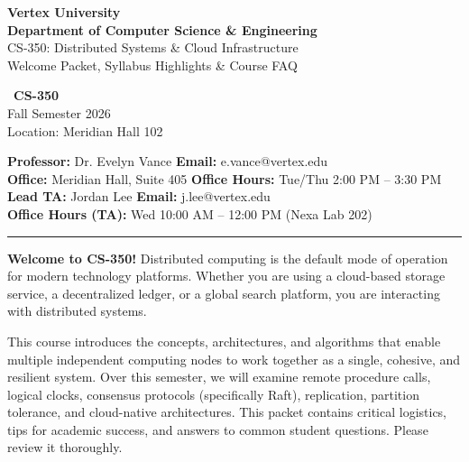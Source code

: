\thispagestyle{plain}

\noindent
\begin{tcolorbox}[
  colback=vertexnavy,
  colframe=vertexnavy,
  arc=4pt,
  boxrule=0pt,
  left=15pt,
  right=15pt,
  top=15pt,
  bottom=15pt
]
  \begin{minipage}[t]{0.7\textwidth}
    \color{white}
    {\huge\bfseries Vertex University}\\[6pt]
    {\large\color{vertexteal!50}\bfseries Department of Computer Science \& Engineering}\\[12pt]
    {\color{white}\Large CS-350: Distributed Systems \& Cloud Infrastructure}\\[4pt]
    {\color{vertexamber}\small Welcome Packet, Syllabus Highlights \& Course FAQ}
  \end{minipage}%
  \begin{minipage}[t]{0.3\textwidth}
    \raggedleft
    \color{white}
    \faGraduationCap\ \textbf{CS-350}\\[4pt]
    \small
    Fall Semester 2026\\
    Location: Meridian Hall 102
  \end{minipage}
\end{tcolorbox}

\vspace{15pt}

\noindent
\textbf{Professor:} Dr. Evelyn Vance \hfill \textbf{Email:} e.vance@vertex.edu \\
\textbf{Office:} Meridian Hall, Suite 405 \hfill \textbf{Office Hours:} Tue/Thu 2:00 PM -- 3:30 PM \\
\textbf{Lead TA:} Jordan Lee \hfill \textbf{Email:} j.lee@vertex.edu \\
\textbf{Office Hours (TA):} Wed 10:00 AM -- 12:00 PM (Nexa Lab 202)

\vspace{15pt}
\hrule
\vspace{15pt}

\noindent
\begin{tcolorbox}[
  colback=bglight,
  colframe=vertexteal,
  arc=3pt,
  boxrule=0.8pt,
  left=10pt,
  right=10pt,
  top=8pt,
  bottom=8pt
]
  \small\color{charcoal}
  \textbf{Welcome to CS-350!} Distributed computing is the default mode of operation for modern technology platforms. Whether you are using a cloud-based storage service, a decentralized ledger, or a global search platform, you are interacting with distributed systems.
  
  This course introduces the concepts, architectures, and algorithms that enable multiple independent computing nodes to work together as a single, cohesive, and resilient system. Over this semester, we will examine remote procedure calls, logical clocks, consensus protocols (specifically Raft), replication, partition tolerance, and cloud-native architectures. This packet contains critical logistics, tips for academic success, and answers to common student questions. Please review it thoroughly.
\end{tcolorbox}
